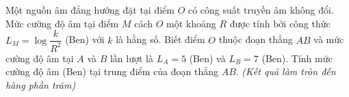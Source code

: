 \begin{ex}%
    Một nguồn âm đẳng hướng đặt tại điểm $O$ có công suất truyền âm không đổi. Mức cường độ âm tại điểm $M$ cách $O$ một khoảng $R$ được tính bởi công thức $L_M = \log \dfrac{k}{R^2}$ (Ben) với $k$ là hằng số. Biết điểm $O$ thuộc đoạn thẳng $AB$ và mức cường độ âm tại $A$ và $B$ lần lượt là $L_A = 5$ (Ben) và $L_B = 7$ (Ben). Tính mức cường độ âm (Ben) tại trung điểm của đoạn thẳng $AB$. \textit{(Kết quả làm tròn đến hàng phần trăm)}\\
\end{ex}
